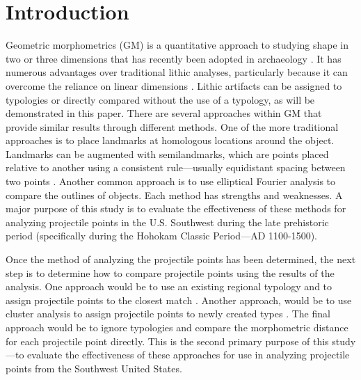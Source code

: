 \documentclass[letterpaper]{article}
\begin{document}
\addlogo
\beginningpreprint  %
{}
\hypertarget{introduction}{%
\section*{Introduction}\label{introduction}}

Geometric morphometrics (GM) is a quantitative approach to studying shape in two or three dimensions that has recently been adopted in archaeology \autocites[see][]{MacLeod2017-yl,Okumura2019-ur}[ for overviews]{Shott2010-fn}. It has numerous advantages over traditional lithic analyses, particularly because it can overcome the reliance on linear dimensions \autocite[196-197]{Shott2010-fn}. Lithic artifacts can be assigned to typologies or directly compared without the use of a typology, as will be demonstrated in this paper. There are several approaches within GM that provide similar results through different methods. One of the more traditional approaches is to place landmarks at homologous locations around the object. Landmarks can be augmented with semilandmarks, which are points placed relative to another using a consistent rule---usually equidistant spacing between two points \autocite[2-4]{Okumura2019-ur}. Another common approach is to use elliptical Fourier analysis to compare the outlines of objects. Each method has strengths and weaknesses. A major purpose of this study is to evaluate the effectiveness of these methods for analyzing projectile points in the U.S. Southwest during the late prehistoric period (specifically during the Hohokam Classic Period---AD 1100-1500).

Once the method of analyzing the projectile points has been determined, the next step is to determine how to compare projectile points using the results of the analysis. One approach would be to use an existing regional typology and to assign projectile points to the closest match \autocite[e.g.,][]{Kocer2017-au}. Another approach, would be to use cluster analysis to assign projectile points to newly created types \autocites[e.g.,][]{Petrik2018-pd,Matzig2021-id}. The final approach would be to ignore typologies and compare the morphometric distance for each projectile point directly. This is the second primary purpose of this study---to evaluate the effectiveness of these approaches for use in analyzing projectile points from the Southwest United States.
\end{document}
